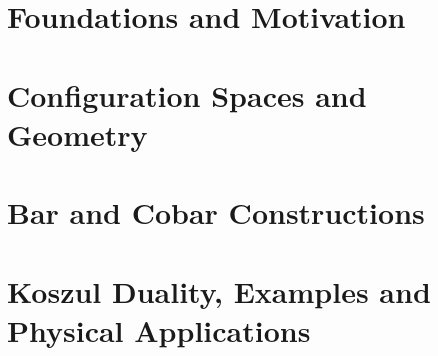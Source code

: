 \documentclass[11pt]{article}
\begin{document}
\part{Foundations and Motivation}



\part{Configuration Spaces and Geometry}



\part{Bar and Cobar Constructions}





\part{Koszul Duality, Examples and Physical Applications}










\appendix




\end{document}
